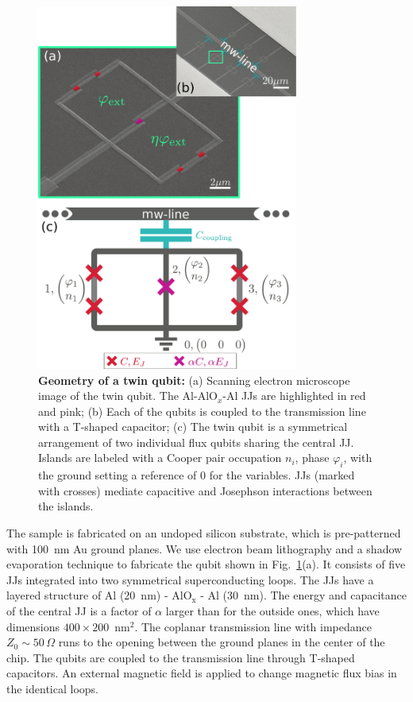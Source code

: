 \documentclass[%
reprint,
superscriptaddress,
bibnotes,
amsmath,
amssymb,
aps,
showkeys,
prb,
]{revtex4-1}
\begin{document}
\begin{figure}[htp]
\centering
  \includegraphics[width=8.6cm]{fig1}
  \caption{\small  \textbf{Geometry  of a  twin  qubit:}  (a) Scanning  electron
    microscope image of the twin qubit. The Al-AlO$_x$-Al JJs are highlighted in
    red and  pink; (b) Each  of the qubits is  coupled to the  transmission line
    with a T-shaped  capacitor; (c) The twin qubit is  a symmetrical arrangement
    of two individual  flux qubits \cite{Orlando_1999} sharing
    the central  JJ.  Islands are labeled  with a Cooper pair  occupation $n_i$,
    phase $\varphi_i$, with the  ground setting a reference of 0 for
    the variables.   JJs  (marked with  crosses)  mediate capacitive  and
    Josephson  interactions between  the islands.
  }
  \label{fig:setup}
\end{figure}

The sample is fabricated on an undoped silicon substrate, which is
pre-patterned with 100~nm Au ground planes. We  use electron beam lithography
and a shadow evaporation  technique to fabricate the qubit shown in
Fig.~\ref{fig:setup}(a). It consists of five JJs integrated into two
symmetrical  superconducting  loops. The  JJs  have  a   layered  structure  of
Al (20~nm) - AlO$_{\text{x}}$ - Al (30~nm).  The energy  and  capacitance of  the
central JJ  is a  factor of  $\alpha$ larger than  for the  outside ones,  which have
dimensions $400\times200$~nm$^2$.    The  coplanar  transmission   line  with
impedance $ Z_{0} \sim 50\,\Omega $ runs to the opening between the ground planes in the
center of the chip. The qubits are coupled to the transmission line
through T-shaped  capacitors.  An external magnetic field is applied to change magnetic flux bias in the identical loops.
\end{document}
